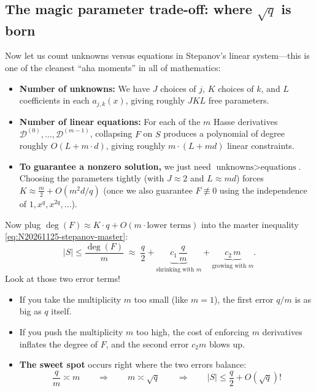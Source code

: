 \subsection{The magic parameter trade-off: where \(\sqrt{q}\) is born}

Now let us count unknowns versus equations in Stepanov's linear system---this is one of the cleanest ``aha moments'' in all of mathematics:
\begin{itemize}
  \item \textbf{Number of unknowns:} We have \(J\) choices of \(j\), \(K\) choices of \(k\), and \(L\) coefficients in each \(a_{j,k}(x)\), giving roughly \(J K L\) free parameters.
  \item \textbf{Number of linear equations:} For each of the \(m\) Hasse derivatives \(\mathcal{D}^{(0)},\allowbreak \dots,\allowbreak \mathcal{D}^{(m-1)}\), collapsing \(F\) on \(S\) produces a polynomial of degree roughly \(O(L + m\cdot d)\), giving roughly \(m \cdot (L + md)\) linear constraints.
  \item \textbf{To guarantee a nonzero solution,} we just need \(\text{unknowns} > \text{equations}\). Choosing the parameters tightly (with \(J \approx 2\) and \(L \approx md\)) forces \(K \approx \tfrac{m}{2} + O(m^2 d / q)\) (once we also guarantee \(F \not\equiv 0\) using the independence of \(1, x^q, x^{2q}, \dots\)).
\end{itemize}
Now plug \(\deg(F) \approx K \cdot q + O(m \cdot \text{lower terms})\) into the master inequality \eqref{eq:N20261125-stepanov-master}:
\[
  |S| \le \frac{\deg(F)}{m}
  \;\approx\;
  \frac{q}{2} + \underbrace{c_1\,\frac{q}{m}}_{\text{shrinking with } m} + \underbrace{c_2\,m}_{\text{growing with } m}.
\]
Look at those two error terms!
\begin{itemize}
  \item If you take the multiplicity \(m\) too small (like \(m = 1\)), the first error \(q/m\) is as big as \(q\) itself.
  \item If you push the multiplicity \(m\) too high, the cost of enforcing \(m\) derivatives inflates the degree of \(F\), and the second error \(c_2 m\) blows up.
  \item \textbf{The sweet spot} occurs right where the two errors balance:
  \[
    \frac{q}{m} \asymp m
    \qquad \Longrightarrow \qquad
    m \asymp \sqrt{q}
    \qquad \Longrightarrow \qquad
    |S| \le \frac{q}{2} + O(\sqrt{q})!
  \]
\end{itemize}

